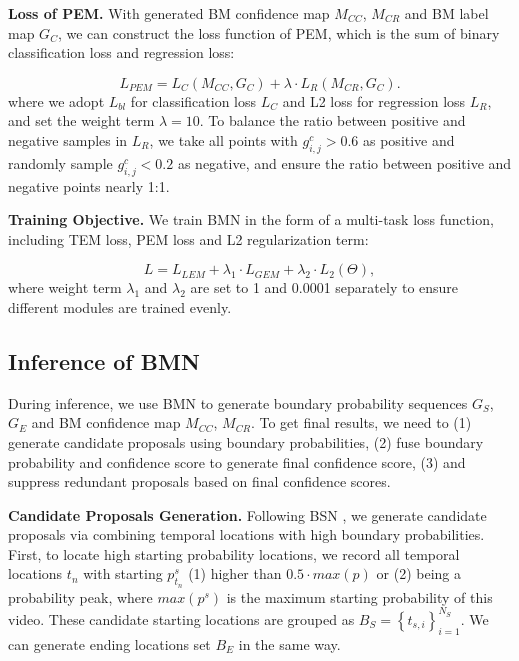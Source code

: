 \documentclass[10pt,twocolumn,letterpaper]{article}
\begin{document}
\noindent
\textbf{Loss of PEM.}
With generated BM confidence map $M_{CC}$, $M_{CR}$ and BM label map $G_C$, we can construct the loss function of PEM, which is the sum of binary classification loss and regression loss:


\begin{equation}
L_{PEM}=  L_{C}(M_{CC},G_C) + \lambda \cdot L_{R}(M_{CR},G_C).
\end{equation}
where we adopt $L_{bl}$ for classification loss $L_C$ and L2 loss for regression loss $L_R$, and set the weight term $\lambda=10$. 
To balance the ratio between positive and negative samples in $L_R$, we take all points with $g^c_{i,j} >0.6$ as positive and randomly sample  $g^c_{i,j} <0.2$ as negative, and ensure the ratio between positive and negative points nearly 1:1.


\noindent
\textbf{Training Objective.}
We train BMN  in the form of a multi-task loss function, including TEM loss, PEM loss and L2 regularization term:


\begin{equation}
L = L_{LEM}+\lambda_1 \cdot L_{GEM} + \lambda_2 \cdot L_2(\Theta),
\end{equation}
where weight term $\lambda_1 $ and $\lambda_2 $ are set to 1 and 0.0001 separately to ensure different modules are trained evenly.



\subsection{Inference of BMN}

During inference, we use BMN to generate boundary probability sequences $G_S$, $G_E$ and BM confidence map $M_{CC}$, $M_{CR}$. To get final results, we need to (1) generate candidate proposals using boundary probabilities, (2) fuse boundary probability and confidence score to generate final confidence score, (3) and suppress redundant proposals based on final confidence scores. 

\noindent
\textbf{Candidate Proposals Generation.}
Following BSN \cite{lin2018bsn}, we generate candidate proposals via combining  temporal locations with high boundary probabilities. 
First, to locate high starting probability locations, we record all temporal locations $t_n$ with starting $p^s_{t_n}$ (1) higher than $0.5\cdot max(p)$ or (2) being a probability peak, where $max(p^s)$ is the maximum starting probability of this video. These candidate starting locations are grouped as $B_S=\left \{ t_{s,i} \right \}_{i=1}^{N_S}$. 
We can generate ending locations set $B_E$ in the same way.
\end{document}

